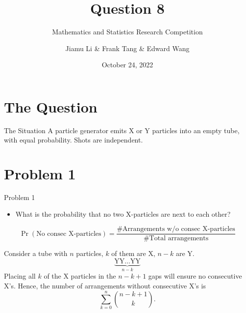 \documentclass[xcolor={usenames,dvipsnames}]{beamer}
\title{Question 8}
\subtitle{Mathematics and Statistics Research Competition}
\author{Jiamu Li \& Frank Tang \& Edward Wang}
\institute{Scotch College}
\date{October 24, 2022}
\DeclareMathOperator{\prob}{Pr}
\begin{document}
\begin{frame}
  \titlepage
\end{frame}

\begin{frame}
  \tableofcontents
\end{frame}

\section{The Question}
\begin{frame}{The Situation}
  A particle generator emits X or Y particles into an empty tube, with equal probability. Shots are independent.
  \begin{center}
    
  \end{center}
\end{frame}
\section{Problem 1}
\begin{frame}{Problem 1}
\begin{itemize}
  \item What is the probability that no two X-particles are next to each other?
\end{itemize}

\begin{equation*}
  \prob(\text{No consec X-particles}) = \frac{\# \text{Arrangements w/o consec X-particles}}{\# \text{Total arrangements}}
\end{equation*}

\end{frame}

\begin{frame}

  Consider a tube with $n$ particles, $k$ of them are X, $n-k$ are Y.
  \begin{equation*}
    \underbrace{\text{YY}\dots\text{YY}}_{n-k}
  \end{equation*}
  Placing all $k$ of the X particles in the $n-k+1$ gaps will ensure no consecutive X's. Hence, the number of arrangements without consecutive X's is
  \begin{equation*}
    \sum_{k=0}^n \binom{n-k+1}{k}.
  \end{equation*}

\end{frame}
\end{document}
